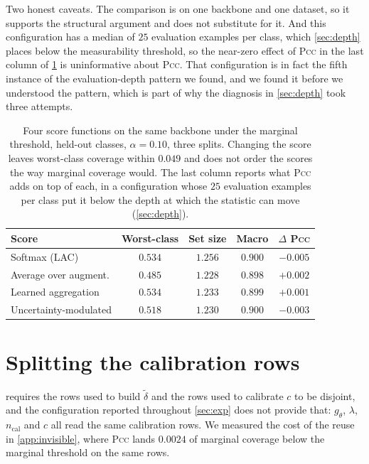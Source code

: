 Two honest caveats. The comparison is on one backbone and one dataset, so it supports the
structural argument and does not substitute for it. And this configuration has a median of $25$
evaluation examples per class, which \cref{sec:depth} places below the measurability threshold,
so the near-zero effect of \textsc{Pcc} in the last column of \cref{tab:scorelevel} is
uninformative about \textsc{Pcc}. That configuration is in fact the fifth instance of the
evaluation-depth pattern we found, and we found it before we understood the pattern, which is
part of why the diagnosis in \cref{sec:depth} took three attempts.

\begin{table}[h]
\centering
\small
\setlength{\tabcolsep}{3pt}
\begin{tabular}{lcccc}
\toprule
Score & Worst-class & Set size & Macro & $\Delta$ \textsc{Pcc} \\
\midrule
Softmax (LAC)          & $0.534$ & $1.256$ & $0.900$ & $-0.005$ \\
Average over augment.  & $0.485$ & $1.228$ & $0.898$ & $+0.002$ \\
Learned aggregation    & $0.534$ & $1.233$ & $0.899$ & $+0.001$ \\
Uncertainty-modulated  & $0.518$ & $1.230$ & $0.900$ & $-0.003$ \\
\bottomrule
\end{tabular}
\caption{Four score functions on the same backbone under the marginal threshold, held-out
classes, $\alpha=0.10$, three splits. Changing the score leaves worst-class coverage within
$0.049$ and does not order the scores the way marginal coverage would. The last column reports
what \textsc{Pcc} adds on top of each, in a configuration whose $25$ evaluation examples per
class put it below the depth at which the statistic can move (\cref{sec:depth}).}
\label{tab:scorelevel}
\end{table}

\section{Splitting the calibration rows}
\label{app:split}

 requires the rows used to build $\tilde\delta$ and the rows used to
calibrate $c$ to be disjoint, and the configuration reported throughout \cref{sec:exp} does not
provide that: $g_\theta$, $\lambda$, $n_{\mathrm{cal}}$ and $c$ all read the same calibration
rows. We measured the cost of the reuse in \cref{app:invisible}, where \textsc{Pcc} lands
$0.0024$ of marginal coverage below the marginal threshold on the same rows.

